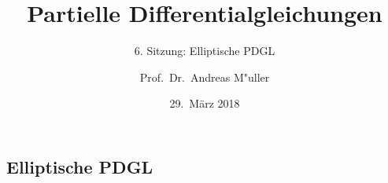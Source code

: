 \documentclass{beamer}
\title[]{Partielle Differentialgleichungen}
\subtitle{6. Sitzung: Elliptische PDGL}
\date[29.~März 2018]{29.~März 2018}
\author{Prof.~Dr.~Andreas M"uller}
\begin{document}
\begin{frame}
\section{Elliptische PDGL}
\titlepage
\end{frame}


\end{document}

